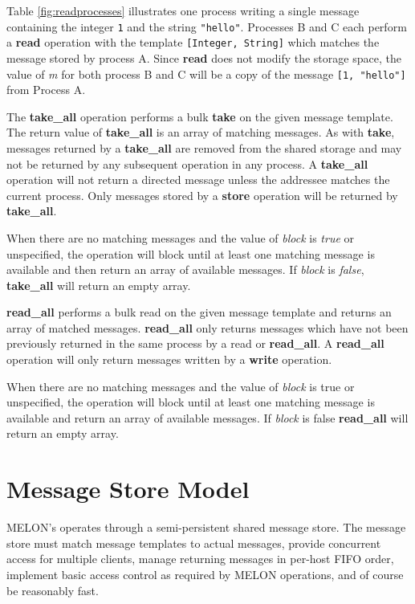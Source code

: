 Table \ref{fig:readprocesses} illustrates one process writing a single message containing the integer \texttt{1} and the string \texttt{"hello"}. Processes B and C each perform a \textbf{read} operation with the template \texttt{[Integer, String]} which matches the message stored by process A. Since \textbf{read} does not modify the storage space, the value of \textit{m} for both process B and C will be a copy of the message \texttt{[1, "hello"]} from Process A.

The \textbf{take\_all} operation performs a bulk \textbf{take} on the given message template. The return value of \textbf{take\_all} is an array of matching messages. As with \textbf{take}, messages returned by a \textbf{take\_all} are removed from the shared storage and may not be returned by any subsequent operation in any process. A \textbf{take\_all} operation will not return a directed message unless the addressee matches the current process. Only messages stored by a \textbf{store} operation will be returned by \textbf{take\_all}.

When there are no matching messages and the value of \textit{block} is \textit{true} or unspecified, the operation will block until at least one matching message is available and then return an array of available messages. If \textit{block} is \textit{false}, \textbf{take\_all} will return an empty array.

\textbf{read\_all} performs a bulk read on the given message template and returns an array of matched messages. \textbf{read\_all} only returns messages which have not been previously returned in the same process by a read or \textbf{read\_all}. A \textbf{read\_all} operation will only return messages written by a \textbf{write} operation.

When there are no matching messages and the value of \textit{block} is true or unspecified, the operation will block until at least one matching message is available and return an array of available messages. If \textit{block} is false \textbf{read\_all} will return an empty array.

\section{Message Store Model}

MELON's operates through a semi-persistent shared message store. The message store must match message templates to actual messages, provide concurrent access for multiple clients, manage returning messages in per-host FIFO order, implement basic access control as required by MELON operations, and of course be reasonably fast.

